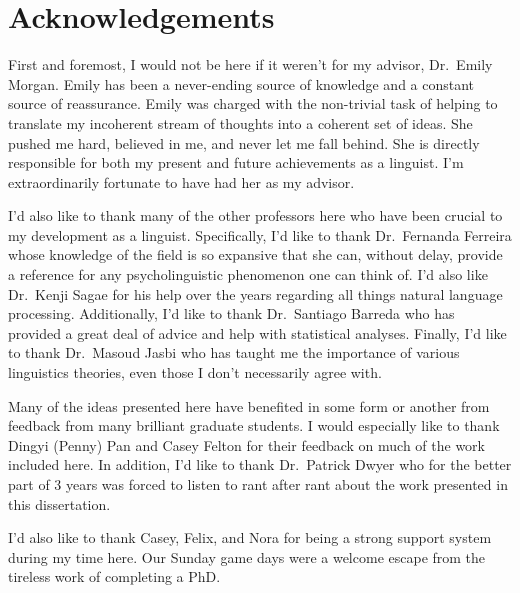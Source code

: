 \documentclass[
  12pt,
  letterpaper,
]{scrreport}
\renewcommand*\contentsname{Table of contents}
\newcommand\contentsname{Table of contents}
\begin{document}
\setcounter{page}{\value{savedpage}} %
\clearpage

\renewcommand*\contentsname{Table of contents}
{
\setcounter{tocdepth}{2}
\tableofcontents
}
\listoffigures
\listoftables


\chapter*{Acknowledgements}\label{sec-acknowledgements}


First and foremost, I would not be here if it weren't for my advisor,
Dr.~Emily Morgan. Emily has been a never-ending source of knowledge and
a constant source of reassurance. Emily was charged with the non-trivial
task of helping to translate my incoherent stream of thoughts into a
coherent set of ideas. She pushed me hard, believed in me, and never let
me fall behind. She is directly responsible for both my present and
future achievements as a linguist. I'm extraordinarily fortunate to have
had her as my advisor.

I'd also like to thank many of the other professors here who have been
crucial to my development as a linguist. Specifically, I'd like to thank
Dr.~Fernanda Ferreira whose knowledge of the field is so expansive that
she can, without delay, provide a reference for any psycholinguistic
phenomenon one can think of. I'd also like Dr.~Kenji Sagae for his help
over the years regarding all things natural language processing.
Additionally, I'd like to thank Dr.~Santiago Barreda who has provided a
great deal of advice and help with statistical analyses. Finally, I'd
like to thank Dr.~Masoud Jasbi who has taught me the importance of
various linguistics theories, even those I don't necessarily agree with.

Many of the ideas presented here have benefited in some form or another
from feedback from many brilliant graduate students. I would especially
like to thank Dingyi (Penny) Pan and Casey Felton for their feedback on
much of the work included here. In addition, I'd like to thank
Dr.~Patrick Dwyer who for the better part of 3 years was forced to
listen to rant after rant about the work presented in this dissertation.

I'd also like to thank Casey, Felix, and Nora for being a strong support
system during my time here. Our Sunday game days were a welcome escape
from the tireless work of completing a PhD.
\end{document}
